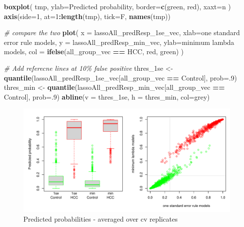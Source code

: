 \documentclass[
]{book}
\newenvironment{Shaded}{\begin{snugshade}}{\end{snugshade}}
\newcommand{\CommentTok}[1]{\textcolor[rgb]{0.56,0.35,0.01}{\textit{#1}}}
\newcommand{\DataTypeTok}[1]{\textcolor[rgb]{0.13,0.29,0.53}{#1}}
\newcommand{\DecValTok}[1]{\textcolor[rgb]{0.00,0.00,0.81}{#1}}
\newcommand{\KeywordTok}[1]{\textcolor[rgb]{0.13,0.29,0.53}{\textbf{#1}}}
\newcommand{\NormalTok}[1]{#1}
\newcommand{\OperatorTok}[1]{\textcolor[rgb]{0.81,0.36,0.00}{\textbf{#1}}}
\newcommand{\StringTok}[1]{\textcolor[rgb]{0.31,0.60,0.02}{#1}}
\begin{document}
\begin{Shaded}
\begin{Highlighting}[]
\KeywordTok{boxplot}\NormalTok{(}
\NormalTok{ tmp,}
 \DataTypeTok{ylab=}\StringTok{\textquotesingle{}Predicted probability\textquotesingle{}}\NormalTok{,}
 \DataTypeTok{border=}\KeywordTok{c}\NormalTok{(}\StringTok{\textquotesingle{}green\textquotesingle{}}\NormalTok{, }\StringTok{\textquotesingle{}red\textquotesingle{}}\NormalTok{),}
 \DataTypeTok{xaxt=}\StringTok{\textquotesingle{}n\textquotesingle{}}
\NormalTok{)}
\KeywordTok{axis}\NormalTok{(}\DataTypeTok{side=}\DecValTok{1}\NormalTok{, }\DataTypeTok{at=}\DecValTok{1}\OperatorTok{:}\KeywordTok{length}\NormalTok{(tmp), }\DataTypeTok{tick=}\NormalTok{F, }\KeywordTok{names}\NormalTok{(tmp))}


\CommentTok{\# compare the two}
\KeywordTok{plot}\NormalTok{(}
 \DataTypeTok{x =}\NormalTok{ lassoAll\_predResp\_1se\_vec, }\DataTypeTok{xlab=}\StringTok{\textquotesingle{}one standard error rule models\textquotesingle{}}\NormalTok{,}
 \DataTypeTok{y =}\NormalTok{ lassoAll\_predResp\_min\_vec, }\DataTypeTok{ylab=}\StringTok{\textquotesingle{}minimum lambda models\textquotesingle{}}\NormalTok{,}
 \DataTypeTok{col =} \KeywordTok{ifelse}\NormalTok{(all\_group\_vec }\OperatorTok{==}\StringTok{ \textquotesingle{}HCC\textquotesingle{}}\NormalTok{, }\StringTok{\textquotesingle{}red\textquotesingle{}}\NormalTok{, }\StringTok{\textquotesingle{}green\textquotesingle{}}\NormalTok{)}
\NormalTok{)}
 
\CommentTok{\# Add referecne lines at 10\% false positive}
\NormalTok{thres\_1se <{-}}\StringTok{ }\KeywordTok{quantile}\NormalTok{(lassoAll\_predResp\_1se\_vec[all\_group\_vec }\OperatorTok{==}\StringTok{ \textquotesingle{}Control\textquotesingle{}}\NormalTok{], }\DataTypeTok{prob=}\NormalTok{.}\DecValTok{9}\NormalTok{)}
\NormalTok{thres\_min <{-}}\StringTok{ }\KeywordTok{quantile}\NormalTok{(lassoAll\_predResp\_min\_vec[all\_group\_vec }\OperatorTok{==}\StringTok{ \textquotesingle{}Control\textquotesingle{}}\NormalTok{], }\DataTypeTok{prob=}\NormalTok{.}\DecValTok{9}\NormalTok{)}
\KeywordTok{abline}\NormalTok{(}\DataTypeTok{v =}\NormalTok{ thres\_1se, }\DataTypeTok{h =}\NormalTok{ thres\_min, }\DataTypeTok{col=}\StringTok{\textquotesingle{}grey\textquotesingle{}}\NormalTok{)}
\end{Highlighting}
\end{Shaded}

\begin{figure}
\centering
\includegraphics{Static/figures/get-sample-pred-1.pdf}
\caption{\label{fig:get-sample-pred}Predicted probabilities - averaged over cv replicates}
\end{figure}
\end{document}
